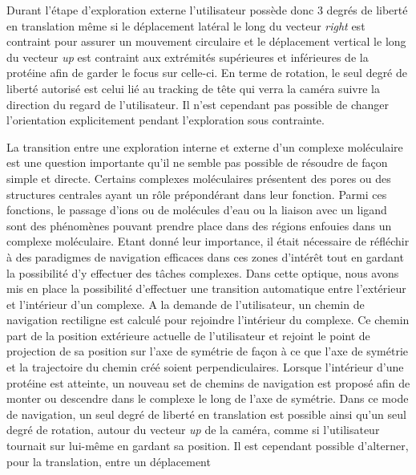 Durant l'étape d'exploration externe l'utilisateur possède donc 3 degrés de liberté en translation même si le déplacement latéral le long du vecteur \textit{right} est contraint pour assurer un mouvement circulaire et le déplacement vertical le long du vecteur \textit{up} est contraint aux extrémités supérieures et inférieures de la protéine afin de garder le focus sur celle-ci. En terme de rotation, le seul degré de liberté autorisé est celui lié au tracking de tête qui verra la caméra suivre la direction du regard de l'utilisateur. Il n'est cependant pas possible de changer l'orientation explicitement pendant l'exploration sous contrainte.

La transition entre une exploration interne et externe d'un complexe moléculaire est une question importante qu'il ne semble pas possible de résoudre de façon simple et directe. Certains complexes moléculaires présentent des pores ou des structures centrales ayant un rôle prépondérant dans leur fonction. Parmi ces fonctions, le passage d'ions ou de molécules d'eau ou la liaison avec un ligand sont des phénomènes pouvant prendre place dans des régions enfouies dans un complexe moléculaire. Etant donné leur importance, il était nécessaire de réfléchir à des paradigmes de navigation efficaces dans ces zones d'intérêt tout en gardant la possibilité d'y effectuer des tâches complexes. Dans cette optique, nous avons mis en place la possibilité d'effectuer une transition automatique entre l'extérieur et l'intérieur d'un complexe. A la demande de l'utilisateur, un chemin de navigation rectiligne est calculé pour rejoindre l'intérieur du complexe. Ce chemin part de la position extérieure actuelle de l'utilisateur et rejoint le point de projection de sa position sur l'axe de symétrie de façon à ce que l'axe de symétrie et la trajectoire du chemin créé soient perpendiculaires. Lorsque l'intérieur d'une protéine est atteinte, un nouveau set de chemins de navigation est proposé afin de monter ou descendre dans le complexe le long de l'axe de symétrie. Dans ce mode de navigation, un seul degré de liberté en translation est possible ainsi qu'un seul degré de rotation, autour du vecteur \textit{up} de la caméra, comme si l'utilisateur tournait sur lui-même en gardant sa position. Il est cependant possible d'alterner, pour la translation, entre un déplacement 




